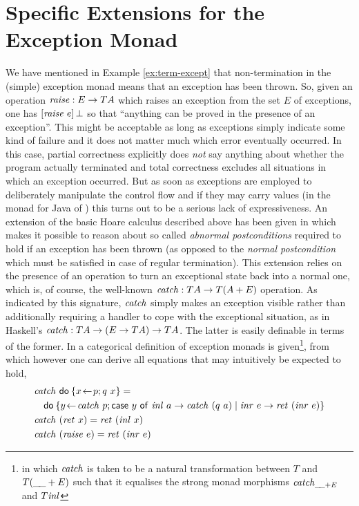 \section{Specific Extensions for the Exception Monad}
\label{sec:spec-extens-except}

We have mentioned in Example \ref{ex:term-except} that non-termination in the
(simple) exception monad means that an exception has been thrown. So, given an
operation $\mathit{raise} : E \to T A$ which raises an exception from the set $E$ of
exceptions, one has $[\mathit{raise}~e]\,{\bot}$ so that ``anything can be proved in
the presence of an exception''. This might be acceptable as long as exceptions
simply indicate some kind of failure and it does not matter much which error
eventually occurred.  In this case, partial correctness explicitly does
\emph{not} say anything about whether the program actually terminated and total
correctness excludes all situations in which an exception occurred.  But as soon
as exceptions are employed to deliberately manipulate the control flow and if
they may carry values (\EG in the monad for Java of
\cite{JacobsPoll00,HuismanJacobs00}) this turns out to be a serious lack of
expressiveness. An extension of the basic Hoare calculus described above has
been given in \cite{SchroederMossakowski:Java} which makes it possible to reason
about so called \emph{abnormal postconditions} required to hold if an exception
has been thrown (as opposed to the \emph{normal postcondition} which must be
satisfied in case of regular termination). This extension relies on the presence
of an operation to turn an exceptional state back into a normal one, which is,
of course, the well-known $\mathit{catch} : T A \to T(A + E)$ operation. As indicated by
this signature, $\mathit{catch}$ simply makes an exception visible rather than
additionally requiring a handler to cope with the exceptional situation, as in
Haskell's $\mathit{catch} : T A \to (E \to T A) \to T A$. The latter is easily definable
in terms of the former.  In \cite{SchroederMossakowski:Java} a categorical
definition of exception monads is given\footnote{in which $\mathit{catch}$ is taken to
  be a natural transformation between $T$ and $T(\_\!\_ + E)$ such that it
  equalises the strong monad morphisms $\mathit{catch}_{\_\!\_ + E}$ and $T\mathit{inl}$}, from
which however one can derive all equations that may intuitively be expected to
hold, \EG
\begin{equation}
  \label{eq:except-eqns}
  \begin{split}
    & \mathit{catch}\ \mathsf{do}\: \{x\!\gets\! p; q\ x\} = \\
    & \quad\mathsf{do}\: \{y\!\gets\! \mathit{catch}\ p; \mathsf{case}\ y\ \mathsf{of}\ \mathit{inl}~a \to \mathit{catch}\ (q~a) \;|\; \mathit{inr}~e \to
    \mathit{ret}\ (\mathit{inr}~e)\}\\
    & \mathit{catch}\ (\mathit{ret}~x) = \mathit{ret}~(\mathit{inl}~x) \\
    & \mathit{catch}\ (\mathit{raise}\ e) = \mathit{ret}~(\mathit{inr}~e)
  \end{split}
\end{equation}
